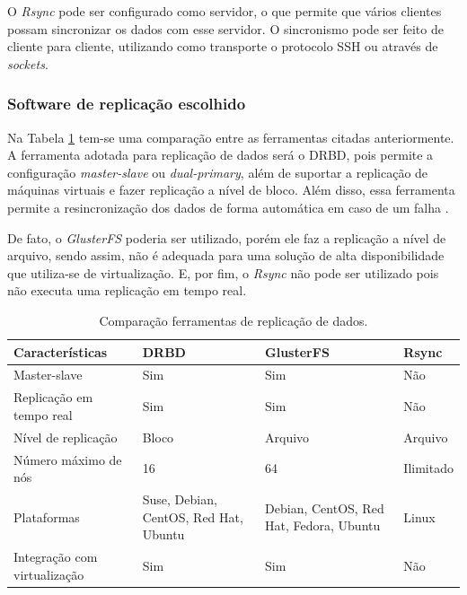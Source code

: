 
O \textit{Rsync} pode ser configurado como servidor, o que permite que vários clientes possam sincronizar os dados com esse servidor. O sincronismo
pode ser feito de cliente para cliente, utilizando como transporte o protocolo \ac{SSH} ou através de \textit{sockets}.


\subsubsection{Software de replicação escolhido}
\label{section:replicacaoescolhido}

Na Tabela \ref{tab:replicacao} tem-se uma comparação entre as ferramentas citadas anteriormente. 
A ferramenta adotada para replicação de dados será o \ac{DRBD}, pois permite a configuração \textit{master-slave} ou \textit{dual-primary}, 
além de suportar a replicação de máquinas virtuais e fazer replicação a nível de bloco. Além disso, essa ferramenta permite a resincronização 
dos dados de forma automática em caso de um falha \cite{drbd}.

De fato, o \textit{GlusterFS} poderia ser utilizado, porém ele faz a replicação a nível de arquivo, sendo assim, não é adequada para uma 
solução de alta disponibilidade que utiliza-se de virtualização. 
E, por fim, o \textit{Rsync} não pode ser utilizado pois não executa uma replicação em tempo real.


\begin{table}[h!]
\caption{Comparação ferramentas de replicação de dados.}
\label{tab:replicacao}
\begin{center}
\begin{tabular}{|l|p{3.5cm}|p{3.5cm}|p{2cm}|}\hline
\textbf{Características} & \textbf{DRBD} & \textbf{GlusterFS} & \textbf{Rsync} \\\hline
Master-slave & Sim & Sim & Não \\\hline
Replicação em tempo real & Sim & Sim & Não \\\hline
Nível de replicação & Bloco & Arquivo & Arquivo \\\hline
Número máximo de nós & 16 & 64 & Ilimitado \\\hline
Plataformas & Suse, Debian, CentOS, Red Hat, Ubuntu & Debian, CentOS, Red Hat, Fedora, Ubuntu & Linux \\\hline
Integração com virtualização & Sim & Sim & Não \\\hline
\end{tabular}
\end{center}
\end{table}

